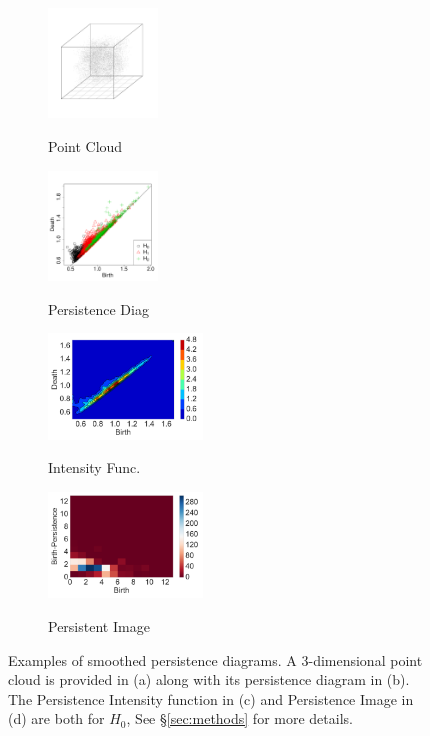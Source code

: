 \documentclass[12pt]{article}
\begin{document}
\begin{figure}[htbp]
  \centering
  \begin{subfigure}{0.22\textwidth}
    \centering
      \caption{Point Cloud}
      \includegraphics[height = 1.15in]{figure_5_plot.pdf}
    \label{fig:examplestest1}
  \end{subfigure}
  \begin{subfigure}{0.22\textwidth}
    \centering
        \caption{Persistence Diag}
        \includegraphics[height = 1.15in]{figure_5_pd.pdf}
    \label{fig:examplestest2}
  \end{subfigure}
  \begin{subfigure}{0.26\textwidth}
    \centering
        \caption{Intensity Func.}
        \includegraphics[height = 1.11in]{figure_5_kernel.pdf}
    \label{fig:examplestest5}
  \end{subfigure}
  \begin{subfigure}{0.26\textwidth}
    \centering
        \caption{Persistent Image}
        \includegraphics[height = 1.11in]{figure_5_pimage_fun.pdf}
    \label{fig:examplestest8}
  \end{subfigure}
  \caption{Examples of smoothed persistence diagrams.  A 3-dimensional point cloud is provided in (a) along with its persistence diagram in (b).
The Persistence Intensity function in (c) and Persistence Image in (d) are both for $H_0$,
See \S \ref{sec:methods} for more details.}
   \label{fig:examples}
\end{figure}
\end{document}
